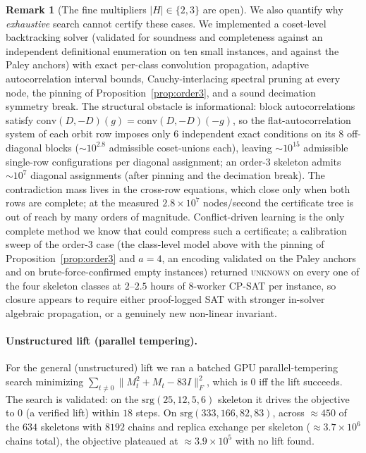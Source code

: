 \documentclass[11pt]{article}
\theoremstyle{definition}
\newtheorem{remark}{Remark}
\begin{document}
\begin{remark}[The fine multipliers $|H|\in\{2,3\}$ are open]
We also quantify why \emph{exhaustive} search cannot certify these cases. We implemented a coset-level
backtracking solver (validated for soundness and completeness against an independent definitional
enumeration on ten small instances, and against the Paley anchors) with exact per-class convolution
propagation, adaptive autocorrelation interval bounds, Cauchy-interlacing spectral pruning at every node,
the pinning of Proposition~\ref{prop:order3}, and a sound decimation symmetry break. The structural
obstacle is informational: block autocorrelations satisfy $\mathrm{conv}(D,-D)(g)=\mathrm{conv}(D,-D)(-g)$,
so the flat-autocorrelation system of each orbit row imposes only $6$ independent exact conditions on its
$8$ off-diagonal blocks ($\sim10^{2.8}$ admissible coset-unions each), leaving $\sim10^{15}$ admissible
single-row configurations per diagonal assignment; an order-$3$ skeleton admits $\sim10^{7}$ diagonal
assignments (after pinning and the decimation break). The contradiction mass lives in the cross-row
equations, which close only when both rows are complete; at the measured $2.8\times10^{7}$ nodes/second
the certificate tree is out of reach by many orders of magnitude. Conflict-driven learning is the only
complete method we know that could compress such a certificate; a calibration sweep of the order-$3$
case (the class-level model above with the pinning of Proposition~\ref{prop:order3} and $a=4$, an
encoding validated on the Paley anchors and on brute-force-confirmed empty instances) returned
\textsc{unknown} on every one of the four skeleton classes at $2$--$2.5$ hours of $8$-worker CP-SAT
per instance, so closure appears to require either proof-logged SAT with stronger in-solver algebraic
propagation, or a genuinely new non-linear invariant.
\end{remark}

\paragraph{Unstructured lift (parallel tempering).} For the general (unstructured) lift we ran a batched
GPU parallel-tempering search minimizing $\sum_{t\neq0}\lVert M_t^2+M_t-83I\rVert_F^2$, which is $0$ iff
the lift succeeds. The search is validated: on the $\mathrm{srg}(25,12,5,6)$ skeleton it drives the
objective to $0$ (a verified lift) within $18$ steps. On $\mathrm{srg}(333,166,82,83)$, across $\approx 450$
of the $634$ skeletons with $8192$ chains and replica exchange per skeleton ($\approx 3.7\times10^6$ chains
total), the objective plateaued at $\approx 3.9\times10^5$ with no lift found.
\end{document}
